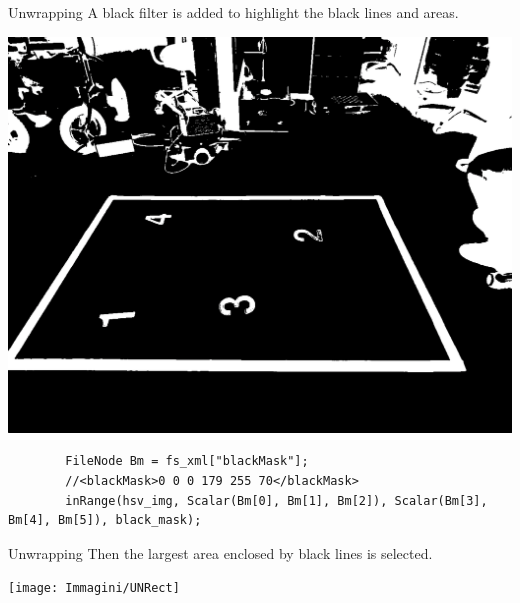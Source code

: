 \begin{frame}[fragile]{Unwrapping}
	A black filter is added to highlight the black lines and areas.
	\begin{center}
		\includegraphics[scale=0.15]{Immagini/UNBlackFilter}
	\end{center}
	\vfill	
	\begin{verbatim}
		FileNode Bm = fs_xml["blackMask"]; 
		//<blackMask>0 0 0 179 255 70</blackMask>
        inRange(hsv_img, Scalar(Bm[0], Bm[1], Bm[2]), Scalar(Bm[3], Bm[4], Bm[5]), black_mask);
	\end{verbatim}
	\vfill
\end{frame}

\begin{frame}[fragile]{Unwrapping}
	Then the largest area enclosed by black lines is selected. 
	\begin{center}
		\texttt{[image: Immagini/UNRect]}
	\end{center}
\end{frame}


